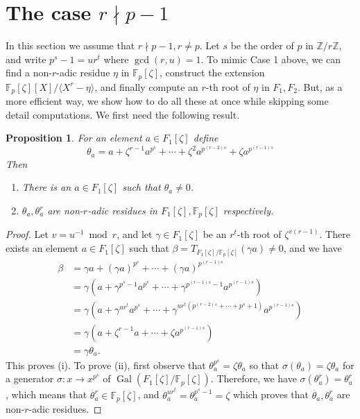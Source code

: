 \documentclass[12pt]{article}
\theoremstyle{plain}
\newtheorem{proposition}[theorem]{Proposition}
\theoremstyle{definition}
\DeclareMathOperator{\gal}{Gal}
\def\F{\mathbb{F}}
\begin{document}

\section{The case $r \nmid p - 1$}

In this section we assume that $r \nmid p - 1, r \ne p$. Let $s$ be the order of $p$ in $\mathbb{Z} / r\mathbb{Z}$, and write $p^s - 1 = ur^t$ where $\gcd(r, u) = 1$. To mimic Case 1 above, we can find a non-$r$-adic residue $\eta$ in $\F_p[\zeta]$, construct the extension $\F_p[\zeta][X] / \langle X^r - \eta \rangle$, and finally compute an $r$-th root of $\eta$ in $F_1, F_2$. But, as a more efficient way, we show how to do all these at once while skipping some detail computations. We first need the following result.
\begin{proposition}
\label{proposition:semi-trace}
	For an element $a \in F_1[\zeta]$ define 
	\begin{equation}
	\label{equation:semi-trace} 
		\theta_a = a + \zeta^{r - 1}a^{p^s} + \cdots + \zeta^2a^{p^{(r - 2)s}} + \zeta a^{p^{(r - 1)s}}
	\end{equation}
	Then
	\begin{enumerate}
		\item[\normalfont (i)] There is an $a \in F_1[\zeta]$ such that $\theta_a \ne 0$.
		\item[\normalfont (ii)] $\theta_a, \theta_a^r$ are non-$r$-adic residues in $F_1[\zeta], \F_p[\zeta]$ respectively.
	\end{enumerate}
\end{proposition}
\begin{proof}
	Let $v = u^{-1} \bmod r$, and let $\gamma \in F_1[\zeta]$ be an $r^t$-th root of $\zeta^{v(r - 1)}$. There exists an element $a \in F_1[\zeta]$ such that $\beta = T_{F_1[\zeta] / \F_p[\zeta]}(\gamma a) \ne 0$, and we have
	\begin{equation}
	\label{equation:trace}
		\begin{aligned}
			\beta 
			& = \gamma a + (\gamma a)^{p^s} + \cdots + (\gamma a)^{p^{(r - 1)s}} \\
			& = \gamma (a + \gamma^{p^s - 1}a^{p^s} + \cdots + \gamma^{p^{(r - 1)s} - 1}a^{p^{(r - 1)s}}) \\
			& = \gamma (a + \gamma^{ur^t}a^{p^s} + \cdots + \gamma^{ur^t(p^{(r - 2)s} + \cdots + p^s + 1)}a^{p^{(r - 1)s}}) \\
			& = \gamma (a + \zeta^{r - 1}a + \cdots + \zeta a^{p^{(r - 1)s}}) \\
			& = \gamma \theta_a.
		\end{aligned}
	\end{equation}
	This proves (i). To prove (ii), first observe that $\theta_a^{p^s} = \zeta\theta_a$ so that $\sigma(\theta_a) = \zeta\theta_a$ for a generator $\sigma: x \to x^{p^s}$ of $\gal(F_1[\zeta] / \F_p[\zeta])$. Therefore, we have $\sigma(\theta_a^r) = \theta_a^r$, which means that $\theta_a^r \in \F_p[\zeta]$, and $\theta_a^{ur^t} = \theta_a^{p^s - 1} = \zeta$ which proves that $\theta_a, \theta_a^r$ are non-$r$-adic residues.
\end{proof}
\end{document}
